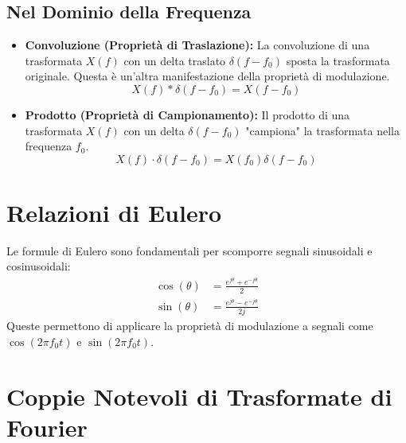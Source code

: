 \subsection*{Nel Dominio della Frequenza}
\begin{itemize}
    \item \textbf{Convoluzione (Proprietà di Traslazione):} La convoluzione di una trasformata $X(f)$ con un delta traslato $\delta(f-f_0)$ sposta la trasformata originale. Questa è un'altra manifestazione della proprietà di modulazione.
    \begin{equation*}
        X(f) * \delta(f-f_0) = X(f-f_0)
    \end{equation*}
    
    \item \textbf{Prodotto (Proprietà di Campionamento):} Il prodotto di una trasformata $X(f)$ con un delta $\delta(f-f_0)$ "campiona" la trasformata nella frequenza $f_0$.
    \begin{equation*}
       X(f) \cdot \delta(f-f_0) = X(f_0) \delta(f-f_0)
    \end{equation*}
\end{itemize}


\section{Relazioni di Eulero}
Le formule di Eulero sono fondamentali per scomporre segnali sinusoidali e cosinusoidali:
\begin{align*}
    \cos(\theta) &= \frac{e^{j\theta} + e^{-j\theta}}{2} \\
    \sin(\theta) &= \frac{e^{j\theta} - e^{-j\theta}}{2j}
\end{align*}
Queste permettono di applicare la proprietà di modulazione a segnali come $\cos(2\pi f_0 t)$ e $\sin(2\pi f_0 t)$.

\section{Coppie Notevoli di Trasformate di Fourier}

